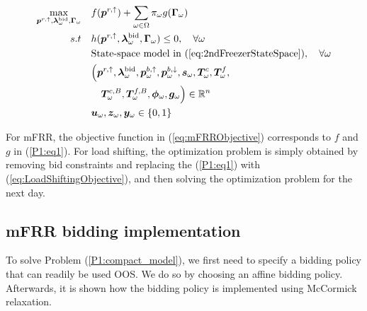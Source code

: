 \begin{subequations}\label{P1:compact_model}
    \begin{align}
        \underset{\bm{p}^{r,\uparrow}, \bm{\lambda}_{\omega}^{\text{bid}}, \bm{\Gamma}_{\omega}}{\textrm{max}} \quad & f(\bm{p}^{r,\uparrow}) + \sum_{\omega \in \Omega} \pi_{\omega} g(\bm{\Gamma}_{\omega}) \label{P1:eq1}
        \\
        s.t \quad                                                                                                    & h(\bm{p}^{r,\uparrow}, \bm{\lambda}_{\omega}^{\text{bid}}, \bm{\Gamma}_{\omega}) \leq 0, \quad \forall{\omega}\label{P1:eq2}                                                                     \\
        \quad                                                                                                        & \text{State-space model in } (\ref{eq:2ndFreezerStateSpace}), \quad \forall{\omega} \label{P1:eq3}
        \\
        \quad                                                                                                        & \Bigl( \bm{p}^{r,\uparrow}, \bm{\lambda}_{\omega}^{\text{bid}}, \bm{p}_{\omega}^{b,\uparrow}, \bm{p}_{\omega}^{b,\downarrow}, \bm{s}_{\omega}, \bm{T}_{\omega}^{c}, \bm{T}_{\omega}^{f}, \notag \\ \quad & \quad \bm{T}_{\omega}^{c, B}, \bm{T}_{\omega}^{f,B}, \bm{\phi}_{\omega}, \bm{g}_{\omega} \Bigr) \in \mathbb{R}^{n}  \label{P1:eq4}
        \\
        \quad                                                                                                        & \bm{u}_{\omega}, \bm{z}_{\omega}, \bm{y}_{\omega} \in \{0,1\}  \label{P1:eq5}
    \end{align}
\end{subequations}

For mFRR, the objective function in (\ref{eq:mFRRObjective}) corresponds to $f$ and $g$ in (\ref{P1:eq1}). For load shifting, the optimization problem is simply obtained by removing bid constraints and replacing the (\ref{P1:eq1}) with (\ref{eq:LoadShiftingObjective}), and then solving the optimization problem for the next day.


\subsection{mFRR bidding implementation}\label{sec:mFRR_bidding_implementation}

To solve Problem (\ref{P1:compact_model}), we first need to specify a bidding policy that can readily be used OOS. We do so by choosing an affine bidding policy. Afterwards, it is shown how the bidding policy is implemented using McCormick relaxation.

